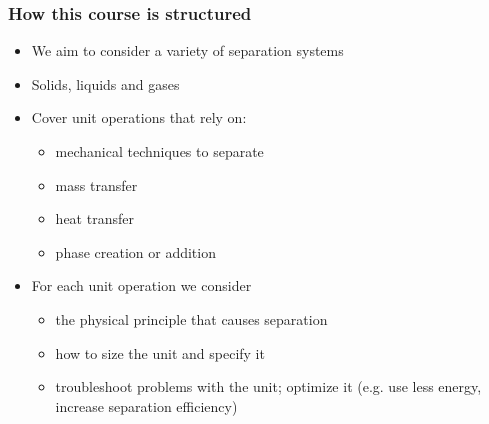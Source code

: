 \begin{frame}\frametitle{How this course is structured}
	\begin{itemize}
		\item	We aim to consider a variety of separation systems
		\item	Solids, liquids and gases
		\item	Cover unit operations that rely on:
		\begin{itemize}
			\item	mechanical techniques to separate
			\item	mass transfer
			\item	heat transfer
			\item	phase creation or addition
		\end{itemize}
		\item	For each unit operation we consider
		\begin{itemize}
			\item	the physical principle that causes separation
			\item	how to size the unit and specify it
			\item	troubleshoot problems with the unit; optimize it (e.g. use less energy, increase separation efficiency)
			
		\end{itemize}
	\end{itemize}
\end{frame}
